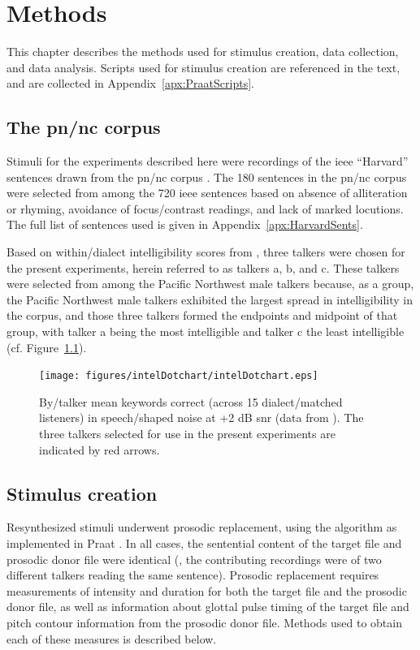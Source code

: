 \chapter{Methods\label{chap:Methods}}

This chapter describes the methods used for stimulus creation, data collection, and data analysis.  Scripts used for stimulus creation are referenced in the text, and are collected in Appendix~\ref{apx:PraatScripts}.%

\section{The \ac{pn/nc} corpus}
Stimuli for the experiments described here were recordings of the \ac{ieee} “Harvard” sentences \citep{HarvardSents} drawn from the \ac{pn/nc} corpus \citep{xxx}.  The 180 sentences in the \ac{pn/nc} corpus were selected from among the 720 \ac{ieee} sentences based on absence of alliteration or rhyming, avoidance of focus/contrast readings, and lack of marked locutions.  The full list of sentences used is given in Appendix~\ref{apx:HarvardSents}.  

Based on within\-/dialect intelligibility scores from \citet{McCloyEtAl2013}, three talkers were chosen for the present experiments, herein referred to as talkers \ac{a}, \ac{b}, and \ac{c}.  These talkers were selected from among the Pacific Northwest male talkers because, as a group, the Pacific Northwest male talkers exhibited the largest spread in intelligibility in the corpus, and those three talkers formed the endpoints and midpoint of that group, with talker \ac{a} being the most intelligible and talker \ac{c} the least intelligible (cf. Figure~\ref{fig:dotchart}).

\begin{figure}
	\begin{centering}
	\texttt{[image: figures/intelDotchart/intelDotchart.eps]}
	\caption[Intelligibility of talkers used to make the stimuli]{By\-/talker mean keywords correct (across 15 dialect\-/matched listeners) in speech\-/shaped noise at +2 dB \ac{snr} (data from \citealt{McCloyEtAl2013}).  The three talkers selected for use in the present experiments are indicated by red arrows.\label{fig:dotchart}}
	\end{centering}
\end{figure}

\section{Stimulus creation\label{sec:StimDesign}}
Resynthesized stimuli underwent prosodic replacement, using the \psola{} algorithm as implemented in Praat \citep{praat}.  In all cases, the sentential content of the target file and prosodic donor file were identical (\ie, the contributing recordings were of two different talkers reading the same sentence).  Prosodic replacement requires measurements of intensity and duration for both the target file and the prosodic donor file, as well as information about glottal pulse timing of the target file and pitch contour information from the prosodic donor file.  Methods used to obtain each of these measures is described below.

